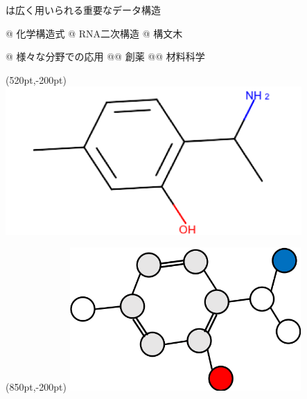 \begin{tcolorbox}[title={\Large 背景}]
	は広く用いられる重要なデータ構造
	\begin{easylist}[itemize]
	@ 化学構造式
	@ RNA二次構造
	@ 構文木 \\
	\end{easylist}
	\vspace{-20pt}

	\begin{easylist}[itemize]
	@ 様々な分野での応用
	@@ 創薬
	@@ 材料科学
	\end{easylist}
	\begin{textblock*}{\textwidth}(520pt,-200pt)
		\includegraphics[width=320pt]{img/chemical.png}
	\end{textblock*}
	\begin{textblock*}{\textwidth}(850pt,-200pt)
		\includegraphics[width=250pt]{img/chemical_graph.png}
	\end{textblock*}
\end{tcolorbox}
